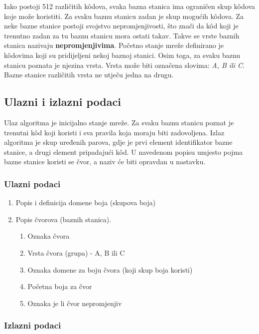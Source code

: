 \documentclass[times, utf8, diplomski, numeric]{fer}
\begin{document}
Iako postoji 512 različitih k\^{o}dova, svaka bazna stanica ima ograničen skup k\^{o}dova koje može koristiti. Za svaku baznu stanicu zadan je skup mogućih k\^{o}dova. Za neke bazne stanice postoji svojstvo nepromjenjivosti, što znači da k\^{o}d koji je trenutno zadan za tu baznu stanicu mora ostati takav. Takve se vrste baznih stanica nazivaju \textbf{nepromjenjivima}. Početno stanje mreže definirano je k\^{o}dovima koji su pridijeljeni nekoj baznoj stanici. Osim toga, za svaku baznu stanicu poznata je njezina vrsta. Vrsta može biti označena slovima: \emph{A, B ili C}. Bazne stanice različitih vrsta ne utječu jedna na drugu.

\subsection{Ulazni i izlazni podaci}

Ulaz algoritma je inicijalno stanje mreže. Za svaku baznu stanicu poznat je trenutni k\^{o}d koji koristi i sva pravila koja moraju biti zadovoljena. Izlaz algoritma je skup uređenih parova, gdje je prvi element identifikator bazne stanice, a drugi element pripadajući k\^{o}d. U navedenom popisu umjesto pojma bazne stanice koristi se čvor, a naziv će biti opravdan u nastavku.

\subsubsection{Ulazni podaci}

\begin{enumerate}
	\item Popis i definicija domene boja (skupova boja)
	\item Popis čvorova (baznih stanica).
		\begin{enumerate}
			\item Oznaka čvora
			\item Vrsta čvora (grupa) - A, B ili C
			\item Oznaka domene za boju čvora (koji skup boja koristi)
			\item Početna boja za čvor
			\item Oznaka je li čvor nepromjenjiv
		\end{enumerate}
\end{enumerate} 

\subsubsection{Izlazni podaci}
\end{document}
